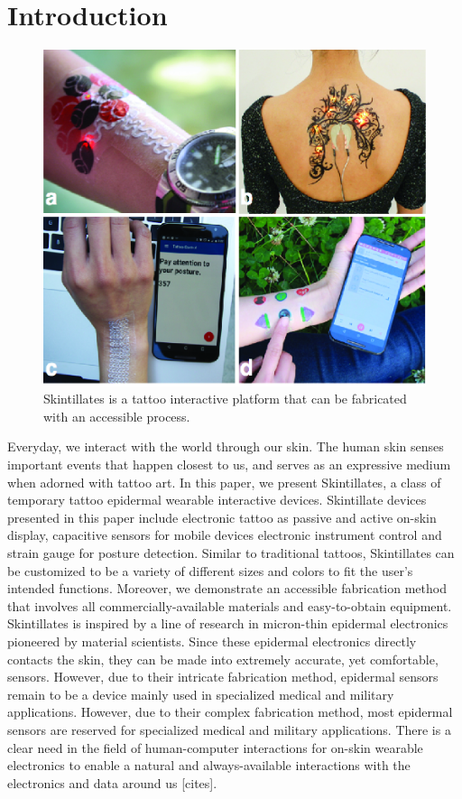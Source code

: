 \documentclass{sigchi}
\begin{document}

\section{Introduction}
\begin{figure}[!h]
\centering
\includegraphics[width=1\columnwidth]{figures/Figure1}
\caption{Skintillates is a tattoo interactive platform that can be fabricated with an accessible process.}
\vspace{-8pt}
\label{fig:overall}
\end{figure}
Everyday, we interact with the world through our skin. The human skin senses important events that happen closest to us, and serves as an expressive medium when adorned with tattoo art. In this paper, we present Skintillates, a class of temporary tattoo epidermal wearable interactive devices. Skintillate devices presented in this paper include electronic tattoo as passive and active on-skin display, capacitive sensors for mobile devices electronic instrument control and strain gauge for posture detection. Similar to traditional tattoos, Skintillates can be customized to be a variety of different sizes and colors to fit the user's intended functions. Moreover, we demonstrate an accessible fabrication method that involves %
all commercially-available materials and easy-to-obtain equipment. 
Skintillates is inspired by a line of research in micron-thin epidermal electronics pioneered by material scientists. Since these epidermal electronics directly contacts the skin, they can be made into extremely accurate, yet comfortable, sensors. However, due to their intricate fabrication method, epidermal sensors remain to be a device mainly used in specialized medical and military applications. However, due to their complex fabrication method, most epidermal sensors are reserved for specialized medical and military applications. There is a clear need in the field of human-computer interactions for on-skin wearable electronics to enable a natural and always-available interactions with the electronics and data around us [cites]. %
\end{document}
